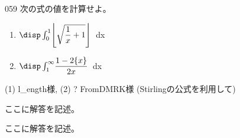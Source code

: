 \begin{thm}{059}{}{}
 次の式の値を計算せよ。
 \begin{enumerate}
  \item $\disp \int_0^1\! \left\lfloor \sqrt{\dfrac{1}{x}+1} \right\rfloor$ \,dx
  \item $\disp \int_1^\infty\! \dfrac{1-2\{x\}}{2x}$ \,dx
 \end{enumerate}
 (1)  l\_ength様, (2) \hosi ? FromDMRK様 (Stirlingの公式を利用して)
\end{thm}

ここに解答を記述。

ここに解答を記述。